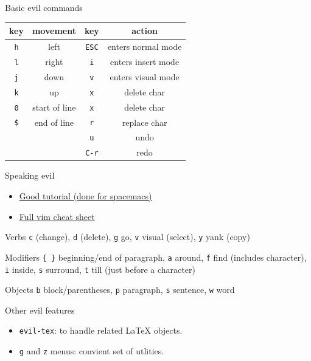 \documentclass[presentation]{beamer}
\begin{document}
\begin{frame}[label={sec:org62ef4a7},fragile]{Basic evil commands}
 \begin{center}
\begin{tabular}{|cc||cc|}
key & movement & key & action\\
\hline
\texttt{h} & left & \texttt{ESC} & enters normal mode\\
\texttt{l} & right & \texttt{i} & enters insert mode\\
\texttt{j} & down & \texttt{v} & enters visual mode\\
\texttt{k} & up & \texttt{x} & delete char\\
\texttt{0} & start of line & \texttt{x} & delete char\\
\texttt{\$} & end of line & \texttt{r} & replace char\\
 &  & \texttt{u} & undo\\
 &  & \texttt{C-r} & redo\\
\end{tabular}
\end{center}
\end{frame}

\begin{frame}[label={sec:org74e4a45},fragile]{Speaking evil}
 \begin{itemize}
\item \href{https://practical.li/spacemacs/spacemacs-basics/vim-basics.html}{Good tutorial (done for spacemacs)}
\item \href{https://external-preview.redd.it/iigrixvxp5aYN9ox7Gr1dfI\_rhLRotWlLsCafjJqjEQ.png?auto=webp\&s=1594ddc17408cb9186a73c2a6d1a1bf1e00769dd}{Full vim cheat sheet}
\end{itemize}

\begin{block}{Verbs}
\texttt{c} (change), \texttt{d} (delete), \texttt{g} go, \texttt{v} visual (select), \texttt{y} yank (copy)
\end{block}

\begin{block}{Modifiers}
\texttt{\{ \}} beginning/end of paragraph, \texttt{a} around, \texttt{f} find (includes character), \texttt{i} inside, \texttt{s} surround, \texttt{t} till (just before a character)
\end{block}
\begin{block}{Objects}
\texttt{b} block/parentheses, \texttt{p} paragraph, \texttt{s} sentence, \texttt{w} word
\end{block}
\end{frame}
\begin{frame}[label={sec:orgff3b1bb},fragile]{Other evil features}
 \begin{itemize}
\item \texttt{evil-tex}: to handle related \LaTeX{} objects.
\item \texttt{g} and \texttt{z} menus: convient set of utlities.
\end{itemize}
\end{frame}
\end{document}
